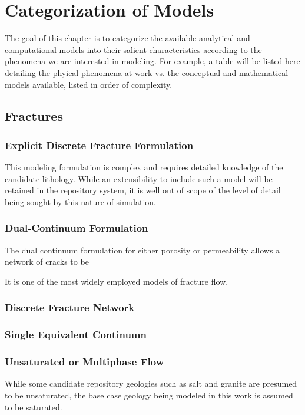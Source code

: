 \chapter{Categorization of Models}\label{ch:categorization}

The goal of this chapter is to categorize the available analytical and 
computational models into their salient characteristics according to the 
phenomena we are interested in modeling. For example, a table will be listed 
here detailing the phyical phenomena at work vs. the conceptual and 
mathematical models available, listed in order of complexity.




\section{Fractures}

\subsection{Explicit Discrete Fracture Formulation}

This modeling formulation is complex and requires detailed knowledge of the 
candidate lithology. While an extensibility to include such a model will be 
retained in the repository system, it is well out of scope of the level of 
detail being sought by this nature of simulation. 

\subsection{Dual-Continuum Formulation}

The dual continuum formulation for either porosity or permeability allows a 
network of cracks to be  

It is one of the most widely employed models of fracture flow. 
\cite{diodato_compendium_1994}

\subsection{Discrete Fracture Network}
\subsection{Single Equivalent Continuum}
\subsection{Unsaturated or Multiphase Flow}
While some candidate repository geologies such as salt and granite are presumed 
to be unsaturated, the base case geology being modeled in this work is assumed 
to be saturated.



